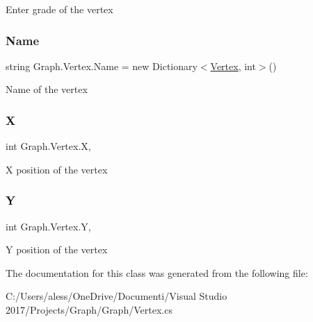 Enter grade of the vertex 

\mbox{\label{class_graph_1_1_vertex_aa0cafbcfdc99942d4b3942abf6d21894}} 
\subsubsection{\texorpdfstring{Name}{Name}}
{\footnotesize\ttfamily string Graph.\+Vertex.\+Name = new Dictionary$<$\hyperlink{class_graph_1_1_vertex}{Vertex}, int$>$()\hspace{0.3cm}{\ttfamily [get]}}



Name of the vertex 

\mbox{\label{class_graph_1_1_vertex_af2284092cc5f24be9656338f4e2fe80f}} 
\subsubsection{\texorpdfstring{X}{X}}
{\footnotesize\ttfamily int Graph.\+Vertex.\+X\hspace{0.3cm}{\ttfamily [get]}, {\ttfamily [set]}}



X position of the vertex 

\mbox{\label{class_graph_1_1_vertex_a7166c79bcdc4d67314cd16b456a24dd2}} 
\subsubsection{\texorpdfstring{Y}{Y}}
{\footnotesize\ttfamily int Graph.\+Vertex.\+Y\hspace{0.3cm}{\ttfamily [get]}, {\ttfamily [set]}}



Y position of the vertex 



The documentation for this class was generated from the following file\+:\begin{DoxyCompactItemize}
\item 
C\+:/\+Users/aless/\+One\+Drive/\+Documenti/\+Visual Studio 2017/\+Projects/\+Graph/\+Graph/Vertex.\+cs\end{DoxyCompactItemize}
